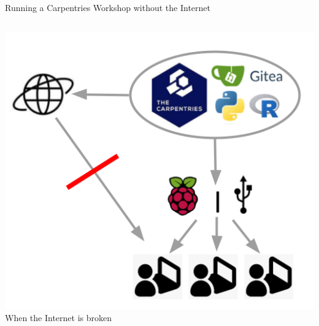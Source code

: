 \documentclass{beamer}
\date{September 5, 2023}
\author{JSS \inst{1} \and FT \inst{1} \and CS \inst{2} \\
	\and AD \inst{3} \and EPW \inst{4} \and SF \inst{5}}
\begin{document}
	\begin{frame}
		\begin{alertblock}
			
			Running a Carpentries Workshop without the Internet
		\end{alertblock}
		\begin{columns}
			\begin{column}{.4\textwidth}
				\centering
				\includegraphics[width=.6\columnwidth]{logos/carpentriesoffline_schemaidea.png} \\
				When the Internet is broken
				

\end{column}
\end{columns}
\end{frame}
\end{document}
